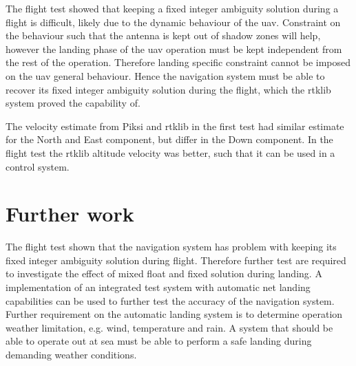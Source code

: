 The flight test showed that keeping a fixed integer ambiguity solution during a flight is difficult, likely due to the dynamic behaviour of the \gls{uav}. Constraint on the behaviour such that the antenna is kept out of shadow zones will help, however the landing phase of the \gls{uav} operation must be kept independent from the rest of the operation. Therefore landing specific constraint cannot be imposed on the \gls{uav} general behaviour. Hence the navigation system must be able to recover its fixed integer ambiguity solution during the flight, which the \gls{rtklib} system proved the capability of.



The velocity estimate from Piksi and \gls{rtklib} in the first test had similar estimate for the North and East component, but differ in the Down component. In the flight test the \gls{rtklib} altitude velocity was better, such that it can be used in a control system.

\section{Further work}
The flight test shown that the navigation system has problem with keeping its fixed integer ambiguity solution during flight.
Therefore further test are required to investigate the effect of mixed float and fixed solution during landing. A implementation of an integrated test system with automatic net landing capabilities can be used to further test the accuracy of the navigation system. Further requirement on the automatic landing system is to determine operation weather limitation, e.g. wind, temperature and rain. A system that should be able to operate out at sea must be able to perform a safe landing during demanding weather conditions.







